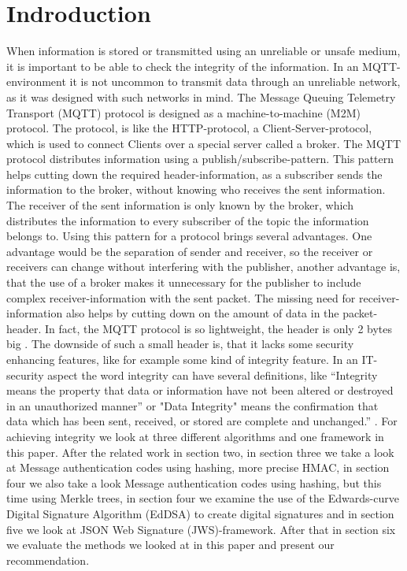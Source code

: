 \section{Indroduction}

When information is stored or transmitted using an unreliable or unsafe medium, it is important to be able to check the integrity of the information. In an MQTT-environment it is not uncommon to transmit data through an unreliable network, as it was designed with such networks in mind. The Message Queuing Telemetry Transport (MQTT) protocol is designed as a machine-to-machine (M2M) protocol. The protocol, is like the HTTP-protocol, a Client-Server-protocol, which is used to connect Clients over a special server called a broker. The MQTT protocol distributes information using a publish/subscribe-pattern. This pattern helps cutting down the required header-information, as a subscriber sends the information to the broker, without knowing who receives the sent information. The receiver of the sent information is only known by the broker, which distributes the information to every subscriber of the topic the information belongs to. Using this pattern for a protocol brings several advantages. One advantage would be the separation of sender and receiver, so the receiver or receivers can change without interfering with the publisher, another advantage is, that the use of a broker makes it unnecessary for the publisher to include complex receiver-information with the sent packet. The missing need for receiver-information also helps by cutting down on the amount of data in the packet-header. In fact, the MQTT protocol is so lightweight, the header is only 2 bytes big \cite{IBM}. The downside of such a small header is, that it lacks some security enhancing features, like for example some kind of integrity feature. In an IT-security aspect the word integrity can have several definitions, like “Integrity means the property that data or information have not been altered or destroyed in an unauthorized manner” \cite{INTI1} or "Data Integrity" means the confirmation that data which has been sent, received, or stored are complete and unchanged.” \cite{INTI2}. For achieving integrity we look at three different algorithms and one framework in this paper. After the related work in section two, in section three we take a look at Message authentication codes using hashing, more precise HMAC, in section four we also take a look Message authentication codes using hashing, but this time using Merkle trees, in section four we examine the use of the Edwards-curve Digital Signature Algorithm (EdDSA) to create digital signatures and in section five we look at JSON Web Signature (JWS)-framework. After that in section six we evaluate the methods we looked at in this paper and present our recommendation.